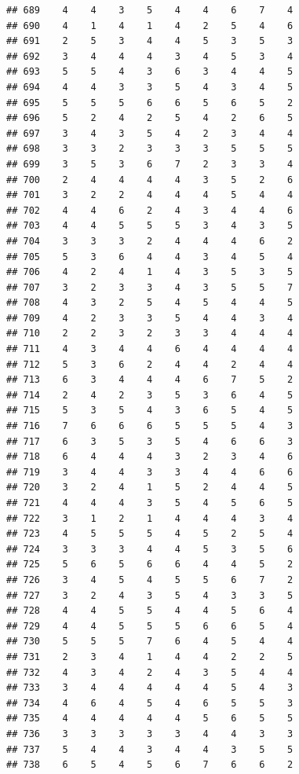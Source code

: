 \documentclass[
]{article}
\begin{document}
\begin{verbatim}
## 689    4    4    3    5    4    4    6    7    4
## 690    4    1    4    1    4    2    5    4    6
## 691    2    5    3    4    4    5    3    5    3
## 692    3    4    4    4    3    4    5    3    4
## 693    5    5    4    3    6    3    4    4    5
## 694    4    4    3    3    5    4    3    4    5
## 695    5    5    5    6    6    5    6    5    2
## 696    5    2    4    2    5    4    2    6    5
## 697    3    4    3    5    4    2    3    4    4
## 698    3    3    2    3    3    3    5    5    5
## 699    3    5    3    6    7    2    3    3    4
## 700    2    4    4    4    4    3    5    2    6
## 701    3    2    2    4    4    4    5    4    4
## 702    4    4    6    2    4    3    4    4    6
## 703    4    4    5    5    5    3    4    3    5
## 704    3    3    3    2    4    4    4    6    2
## 705    5    3    6    4    4    3    4    5    4
## 706    4    2    4    1    4    3    5    3    5
## 707    3    2    3    3    4    3    5    5    7
## 708    4    3    2    5    4    5    4    4    5
## 709    4    2    3    3    5    4    4    3    4
## 710    2    2    3    2    3    3    4    4    4
## 711    4    3    4    4    6    4    4    4    4
## 712    5    3    6    2    4    4    2    4    4
## 713    6    3    4    4    4    6    7    5    2
## 714    2    4    2    3    5    3    6    4    5
## 715    5    3    5    4    3    6    5    4    5
## 716    7    6    6    6    5    5    5    4    3
## 717    6    3    5    3    5    4    6    6    3
## 718    6    4    4    4    3    2    3    4    6
## 719    3    4    4    3    3    4    4    6    6
## 720    3    2    4    1    5    2    4    4    5
## 721    4    4    4    3    5    4    5    6    5
## 722    3    1    2    1    4    4    4    3    4
## 723    4    5    5    5    4    5    2    5    4
## 724    3    3    3    4    4    5    3    5    6
## 725    5    6    5    6    6    4    4    5    2
## 726    3    4    5    4    5    5    6    7    2
## 727    3    2    4    3    5    4    3    3    5
## 728    4    4    5    5    4    4    5    6    4
## 729    4    4    5    5    5    6    6    5    4
## 730    5    5    5    7    6    4    5    4    4
## 731    2    3    4    1    4    4    2    2    5
## 732    4    3    4    2    4    3    5    4    4
## 733    3    4    4    4    4    4    5    4    3
## 734    4    6    4    5    4    6    5    5    3
## 735    4    4    4    4    4    5    6    5    5
## 736    3    3    3    3    3    4    4    3    3
## 737    5    4    4    3    4    4    3    5    5
## 738    6    5    4    5    6    7    6    6    2

\end{verbatim}
\end{document}
